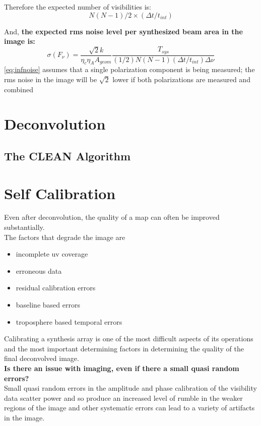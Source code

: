 \documentclass[10pt]{report}
\newcommand{\tbf}[1]{\textbf{#1}}
\begin{document}
 
 Therefore the expected number of visibilities is:
 \begin{equation}
 N(N-1)/2 \times (\Delta t/t_{int})
 \end{equation}
 
 And, \tbf{the expected rms noise level per synthesized beam area in the image is:}
 \begin{equation}\label{eq:infnoise}
 \sigma(F_\nu)=\frac{\sqrt{2}k}{\eta_c \eta_A A_{geom}}\frac{T_{sys}}{(1/2)N(N-1)(\Delta t/t_{int})\Delta \nu}
 \end{equation}
\eqref{eq:infnoise}  assumes that a single polarization component is being measured; the rms noise in the image will be $\sqrt{2}$ lower if both polarizations are measured and combined
\section{Deconvolution}
\subsection{The CLEAN Algorithm}
 
\section{Self Calibration}
Even after deconvolution, the quality of a map can often be improved substantially. \\

The factors  that degrade the image are
\begin{itemize}
\item incomplete uv coverage
\item erroneous data
\item residual calibration errors
\item baseline based errors
\item troposphere based temporal errors
\end{itemize}

Calibrating a synthesis array is one of the most difficult aspects of its operations and the most important determining factors in determining the quality of the final deconvolved image.\\

\tbf{Is there an issue with imaging, even if there a small quasi random errors?}\\

Small quasi random errors in the amplitude and phase calibration of the visibility data scatter power and so produce an increased level of rumble in the weaker regions of the image and other systematic errors can lead to a variety of artifacts in the image.\\
\end{document}
